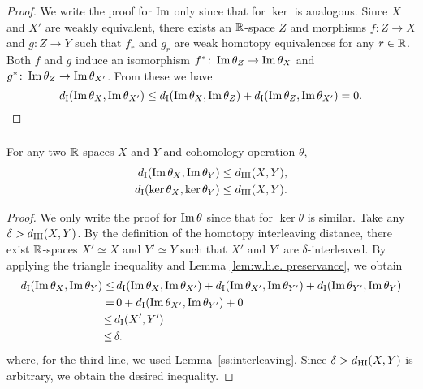 \begin{proof}
	We write the proof for $\operatorname{Im}$ only since that for $\ker$ is analogous.
	Since $X$ and $X'$ are weakly equivalent, there exists an $\mathbb{R}$-space $Z$ and morphisms $f \colon Z \to X$ and $g \colon Z \to Y$ such that $f_r$ and $g_r$ are weak homotopy equivalences for any $r \in \mathbb{R}$.
        Both $f$ and $g$ induce an isomorphism $f^* \colon \operatorname{Im}\theta_{Z} \to \operatorname{Im}\theta_{X}$ and $g^* \colon \operatorname{Im}\theta_{Z} \to \operatorname{Im}\theta_{X'}$. 
	From these we have
	\[
	d_{\mathrm{I}}(\operatorname{Im}\theta_{X},\operatorname{Im}\theta_{X'}) \leq
	d_{\mathrm{I}}(\operatorname{Im}\theta_{X},\operatorname{Im}\theta_{Z}) + d_{\mathrm{I}}(\operatorname{Im}\theta_{Z},\operatorname{Im}\theta_{X'}) =
	0.\qedhere
	\]
\end{proof}

\subsubsection{}\label{thm:theta stability}
\theorem For any two $\mathbb{R}$-spaces $X$ and $Y$ and cohomology operation $\theta$,
\begin{align*}
	d_{\mathrm{I}}(\operatorname{Im}\theta_{X}, \operatorname{Im}\theta_{Y}) &\leq d_{\mathrm{HI}}(X,Y), \\
	d_{\mathrm{I}}(\ker\theta_{X}, \ker\theta_{Y}) &\leq d_{\mathrm{HI}}(X,Y).
\end{align*}

\begin{proof}
	We only write the proof for $\operatorname{Im}\theta$ since that for $\ker\theta$ is similar.
	Take any $\delta > d_{\mathrm{HI}}(X,Y)$.
	By the definition of the homotopy interleaving distance, there exist $\mathbb{R}$-spaces $X' \simeq X$ and $Y' \simeq Y$ such that $X'$ and $Y'$ are $\delta$-interleaved.
	By applying the triangle inequality and Lemma \ref{lem:w.h.e. preservance}, we obtain
	\begin{align*}
		d_{\mathrm{I}}(\operatorname{Im}\theta_{X}, \operatorname{Im}\theta_{Y}) \leq& \,
		d_{\mathrm{I}}(\operatorname{Im}\theta_{X}, \operatorname{Im}\theta_{X'}) + d_{\mathrm{I}}(\operatorname{Im}\theta_{X'}, \operatorname{Im}\theta_{Y'}) + d_{\mathrm{I}}(\operatorname{Im}\theta_{Y'}, \operatorname{Im}\theta_{Y}) \\ =& \, 
		0 + d_{\mathrm{I}}(\operatorname{Im}\theta_{X'}, \operatorname{Im}\theta_{Y'}) + 0 \\ \leq \,&
		d_{\mathrm{I}}(X',Y') \\ \leq \,&
		\delta.
	\end{align*}
	where, for the third line, we used Lemma~\ref{ss:interleaving}.
 	Since $\delta > d_{\mathrm{HI}}(X,Y)$ is arbitrary, we obtain the desired inequality.
\end{proof}

